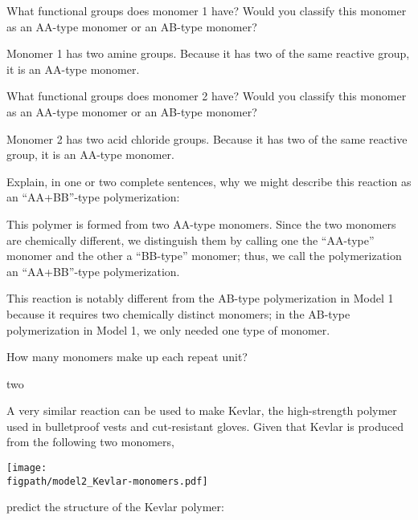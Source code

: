 \begin{activity}
\begin{ctqs}
		\question What functional groups does monomer 1 have?   Would you classify this monomer as an AA-type monomer or an AB-type monomer?
			
				\begin{solution}[0.75in]
					Monomer 1 has two amine groups.  Because it has two of the same reactive group, it is an AA-type monomer.
				\end{solution}
		
		\question What functional groups does monomer 2 have?   Would you classify this monomer as an AA-type monomer or an AB-type monomer?
			
				\begin{solution}[0.75in]
					Monomer 2 has two acid chloride groups.  Because it has two of the same reactive group, it is an AA-type monomer.
				\end{solution}
		
		\question Explain, in one or two complete sentences, why we might describe this reaction as an ``AA+BB''-type polymerization:
			
				\begin{solution}[1.75in]
					This polymer is formed from two AA-type monomers.  Since the two monomers are chemically different, we distinguish them by calling one the ``AA-type'' monomer and the other a ``BB-type'' monomer; thus, we call the polymerization an ``AA+BB''-type polymerization.
					
					This reaction is notably different from the AB-type polymerization in Model 1 because it requires two chemically distinct monomers; in the AB-type polymerization in Model 1, we only needed one type of monomer.
				\end{solution}
		
		\question How many monomers make up each repeat unit?
			
				\begin{solution}[1in]
					two
				\end{solution}
		
		\question A very similar reaction can be used to make Kevlar, the high-strength polymer used in bulletproof vests and cut-resistant gloves.  Given that Kevlar is produced from the following two monomers,
		
	
	\centerline{\texttt{[image: \\figpath/model2\_Kevlar-monomers.pdf]}}
		
		predict the structure of the Kevlar polymer:
			
				\begin{solution}[2.5in]
\end{solution}
\end{ctqs}
\end{activity}
